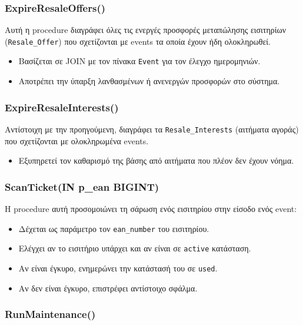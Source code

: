 \documentclass[13pt]{extarticle}
\begin{document}
\subsubsection{ExpireResaleOffers()}

Αυτή η procedure διαγράφει όλες τις ενεργές προσφορές μεταπώλησης εισιτηρίων (\texttt{Resale\_Offer}) που σχετίζονται με events τα οποία έχουν ήδη ολοκληρωθεί.
\begin{itemize}
    \item Βασίζεται σε JOIN με τον πίνακα \texttt{Event} για τον έλεγχο ημερομηνιών.
    \item Αποτρέπει την ύπαρξη λανθασμένων ή ανενεργών προσφορών στο σύστημα.
\end{itemize}

\subsubsection{ExpireResaleInterests()}

Αντίστοιχη με την προηγούμενη, διαγράφει τα \texttt{Resale\_Interests} (αιτήματα αγοράς) που σχετίζονται με ολοκληρωμένα events.
\begin{itemize}
    \item Εξυπηρετεί τον καθαρισμό της βάσης από αιτήματα που πλέον δεν έχουν νόημα.
\end{itemize}

\subsubsection{ScanTicket(IN p\_ean BIGINT)}

Η procedure αυτή προσομοιώνει τη σάρωση ενός εισιτηρίου στην είσοδο ενός event:
\begin{itemize}
    \item Δέχεται ως παράμετρο τον \texttt{ean\_number} του εισιτηρίου.
    \item Ελέγχει αν το εισιτήριο υπάρχει και αν είναι σε \texttt{active} κατάσταση.
    \item Αν είναι έγκυρο, ενημερώνει την κατάστασή του σε \texttt{used}.
    \item Αν δεν είναι έγκυρο, επιστρέφει αντίστοιχο σφάλμα.
\end{itemize}

\subsubsection{RunMaintenance()}
\end{document}
